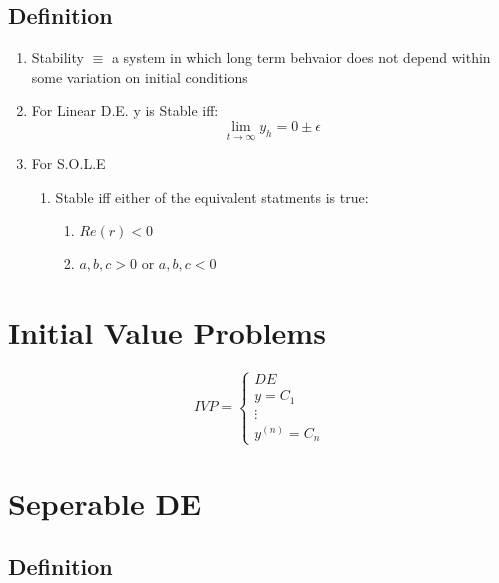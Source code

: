 \documentclass[11pt]{article}
\begin{document}
\subsection{Definition}
\label{sec-3.1}

\begin{enumerate}
\item Stability $\equiv$ a system in which long term behvaior does not
      depend within some variation on initial conditions
\item For Linear D.E. y is Stable iff:
    \begin{equation}
    \lim_{t\rightarrow \infty} y_h = 0 \pm \epsilon
    \end{equation}
\item For S.O.L.E

\begin{enumerate}
\item Stable iff either of the equivalent statments is true:

\begin{enumerate}
\item $Re(r) < 0$
\item $a,b,c >0$ or $a,b,c <0$
\end{enumerate}

\end{enumerate}

\end{enumerate}
\section{Initial Value Problems}
\label{sec-4}

  \begin{equation}
  IVP = \left \{
  \begin{array}{lr}
  DE\\
  y = C_1\\
  \vdots\\
  y^{(n)} = C_n
  \end{array}
  \right.
  \end{equation}
 
\section{Seperable DE}
\label{sec-5}

\subsection{Definition}
\label{sec-5.1}
\end{document}
